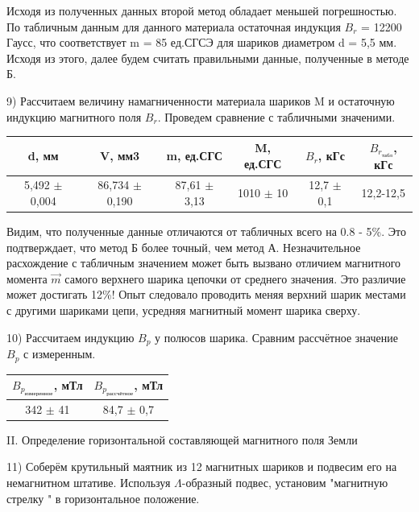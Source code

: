 \documentclass[a4paper,12pt]{article}
\begin{document}
Исходя из полученных данных второй метод обладает меньшей погрешностью. 
По табличным данным для данного материала остаточная индукция $B_r$ = 12200 Гаусс, что соответствует m = 85 ед.СГСЭ для шариков диаметром d = 5,5 мм. 
Исходя из этого, далее будем считать правильными данные, полученные в методе Б.

9) Рассчитаем величину намагниченности материала шариков M и остаточную индукцию магнитного поля $B_r$. Проведем сравнение с табличными значеними. 

\begin{center}
\begin{tabular}{|c|c|c|c|c|c|}
	\hline
	d, мм & V, мм3 & m, ед.СГС & M, ед.СГС & $B_r$, кГс & $B_{r_{табл}}$, кГс \\
	\hline
	5,492 $\pm$ 0,004 & 86,734 $\pm$ 0,190 & 87,61 $\pm$ 3,13 & 1010 $\pm$ 10 & 12,7 $\pm$ 0,1 & 12,2-12,5\\
	\hline
\end{tabular}
\end{center}

Видим, что полученные данные отличаются от табличных всего на 0.8 - 5\%. Это подтверждает, что метод Б более точный, чем метод А. Незначительное расхождение с табличным значением может быть вызвано отличием магнитного момента $\vec{m}$ самого верхнего шарика цепочки от среднего значения. Это различие может достигать 12\%! Опыт следовало проводить меняя верхний шарик местами с другими шариками цепи, усредняя магнитный момент шарика сверху.

10) Рассчитаем индукцию $B_p$ у полюсов шарика. Сравним рассчётное значение $B_p$ с измеренным.

\begin{center}
\begin{tabular}{|c|c|}
	\hline
	$B_{p_{измеренное}}$, мТл & $B_{p_{рассчётное}}$, мТл \\
	\hline
	342 $\pm$ 41 & 84,7 $\pm$ 0,7 \\ 
	\hline
\end{tabular}
\end{center}

II. Определение горизонтальной составляющей магнитного поля Земли

11) Соберём крутильный маятник из 12 магнитных шариков и подвесим его на немагнитном штативе. Используя $\Lambda$-образный подвес, установим "магнитную стрелку " в горизонтальное положение.

\end{document}
